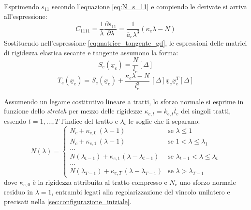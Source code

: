 Esprimendo $s_{11}$ secondo l'equazione \eqref{eq:N_s_11} e compiendo le derivate si arriva all'espressione:
 \begin{equation}
    C_{1111} = \frac{1}{\lambda} \frac{\partial s_{11}}{\partial \lambda} = \frac{1}{\bar{a}_e{\lambda}^3} \left( \kappa_e \lambda - N\right)
    \label{eq:C1111_2}
\end{equation}
Sostituendo nell'espressione \eqref{eq:matrice_tangente_gd}, le espressioni delle matrici di rigidezza elastica secante e tangente assumono la forma: 
\begin{equation}
   S_e(\underline{x}_e) = \frac{N}{l_e} \left[ \Delta \right]
   \label{eq:matrice_secante_gd2}
\end{equation}
\begin{equation}
   T_e\left(\underline{x}_e\right) = S_e\left(\underline{x}_e\right) +  \frac{\kappa_e \lambda - N}{l_e^3}\,[\Delta]\underline{x}_e\underline{x}_e^T[\Delta]
   \label{eq:matrice_tangente_gd_2}
\end{equation}

Assumendo un legame costitutivo lineare a tratti, lo sforzo normale si esprime in funzione dello \textit{stretch} per mezzo delle rigidezze $\kappa_{e,t} = k_{e,t}\overline{l}_e$ dei singoli tratti, essendo $t = 1,\dots,T$ l'indice del tratto e $\lambda_{t}$ le soglie che li separano:
\begin{equation}
   N(\lambda) =
\begin{cases}
    N_c + \kappa_{e,0}\,(\lambda - 1) & \text{se } \lambda \leq 1 \\[6pt]
    N_c + \kappa_{e,1}\,(\lambda - 1) & \text{se } 1 < \lambda \leq \lambda_{1} \\[6pt]
    \dots\\[6pt]
    N(\lambda_{t-1}) + \kappa_{e,t}\,(\lambda - \lambda_{t-1}) & \text{se } \lambda_{t-1} < \lambda \leq \lambda_{t} \\[6pt]
    \dots\\[6pt]
    N(\lambda_{T-1}) + \kappa_{e,T}\,(\lambda - \lambda_{T-1}) & \text{se } \lambda > \lambda_{T-1}
\end{cases}
\label{eq:tension_only2_gd}
\end{equation}
dove $\kappa_{e,0}$ è la rigidezza attribuita al tratto compresso e $N_c$ uno sforzo normale residuo in $\lambda = 1$, entrambi legati alla regolarizzazione del vincolo unilatero e precisati nella \cref{sec:configurazione_iniziale}. 

